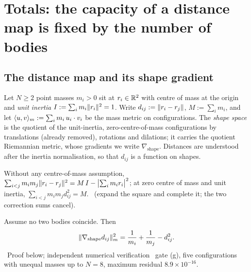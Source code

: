 \section{Totals: the capacity of a distance map is fixed by the number of bodies}\label{sec:totals}

\subsection{The distance map and its shape gradient}

Let $N\ge2$ point masses $m_i>0$ sit at $r_i\in\mathbb{R}^2$ with centre of mass at the origin and
\emph{unit inertia} $I:=\sum_i m_i\lVert r_i\rVert^2=1$. Write $d_{ij}:=\lVert r_i-r_j\rVert$, $M:=\sum_i m_i$,
and let $\langle u,v\rangle_m:=\sum_i m_i\,u_i\cdot v_i$ be the mass metric on configurations. The
\emph{shape space} is the quotient of the unit-inertia, zero-centre-of-mass configurations by
translations (already removed), rotations and dilations; it carries the quotient Riemannian
metric, whose gradients we write $\nabla_{\mathrm{shape}}$. Distances are understood after the
inertia normalisation, so that $d_{ij}$ is a function on shapes.

\begin{lemma}\label{lem:inertia}
Without any centre-of-mass assumption,
$\sum_{i<j}m_im_j\lVert r_i-r_j\rVert^2=M\,I-\bigl|\sum_im_ir_i\bigr|^2$; at zero centre of mass and
unit inertia, $\sum_{i<j}m_im_jd_{ij}^2=M$.
\T\ (expand the square and complete it; the two correction sums cancel).
\end{lemma}

\begin{theorem}\label{thm:perpairs}
Assume no two bodies coincide. Then
\begin{equation}\label{eq:perpairs}
   \lVert\nabla_{\mathrm{shape}}d_{ij}\rVert_m^2=\frac{1}{m_i}+\frac{1}{m_j}-d_{ij}^2 .
\end{equation}
\T\ Proof below; independent numerical verification \V\ gate  (g),
five configurations with unequal masses up to $N=8$, maximum residual $8.9\times10^{-16}$.
\end{theorem}

